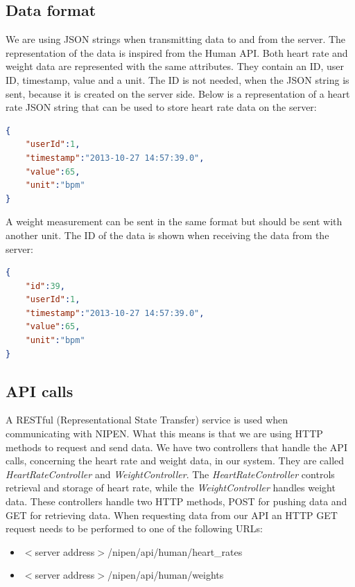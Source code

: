 \subsection{Data format}

We are using JSON strings when transmitting data to and from the server.
The representation of the data is inspired from the Human API.
Both heart rate and weight data are represented with the same attributes.
They contain an ID, user ID, timestamp, value and a unit.
The ID is not needed, when the JSON string is sent, because it is created on the server side.
Below is a representation of a heart rate JSON string that can be used to store heart rate data on the server:

\begin{lstlisting}[language=json]
{
    "userId":1,
    "timestamp":"2013-10-27 14:57:39.0",
    "value":65,
    "unit":"bpm"
}
\end{lstlisting}

A weight measurement can be sent in the same format but should be sent with another unit.
The ID of the data is shown when receiving the data from the server:

\begin{lstlisting}[language=json]
{
    "id":39,
    "userId":1,
    "timestamp":"2013-10-27 14:57:39.0",
    "value":65,
    "unit":"bpm"
}
\end{lstlisting} 

\subsection{API calls}

A RESTful (Representational State Transfer) service is used when communicating with NIPEN.
What this means is that we are using HTTP methods to request and send data.
We have two controllers that handle the API calls, concerning the heart rate and weight data, in our system.
They are called \textit{HeartRateController} and \textit{WeightController}. 
The \textit{HeartRateController} controls retrieval and storage of heart rate, while the \textit{WeightController} handles weight data.
These controllers handle two HTTP methods, POST for pushing data and GET for retrieving data.
When requesting data from our API an HTTP GET request needs to be performed to one of the following URLs:

\begin{itemize}
\item $<$server address$>$/nipen/api/human/heart\_rates
\item $<$server address$>$/nipen/api/human/weights
\end{itemize}

